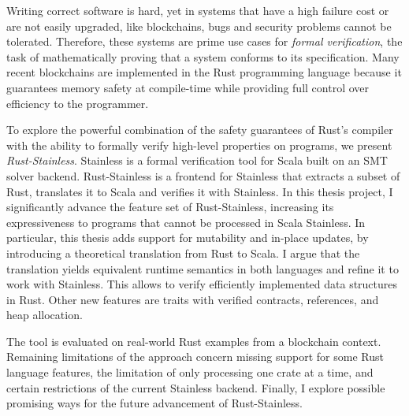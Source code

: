 Writing correct software is hard, yet in systems that have a high failure cost
or are not easily upgraded, like blockchains, bugs and security problems cannot
be tolerated. Therefore, these systems are prime use cases for \emph{formal
verification}, the task of mathematically proving that a system conforms to its
specification. Many recent blockchains are implemented in the Rust programming
language because it guarantees memory safety at compile-time while providing
full control over efficiency to the programmer.

To explore the powerful combination of the safety guarantees of Rust's compiler
with the ability to formally verify high-level properties on programs, we
present \emph{Rust-Stainless}. Stainless is a formal verification tool for Scala
built on an SMT solver backend. Rust-Stainless is a frontend for Stainless that
extracts a subset of Rust, translates it to Scala and verifies it with
Stainless. In this thesis project, I significantly advance the feature set of
Rust-Stainless, increasing its expressiveness to programs that cannot be
processed in Scala Stainless. In particular, this thesis adds support for
mutability and in-place updates, by introducing a theoretical translation from
Rust to Scala. I argue that the translation yields equivalent runtime semantics
in both languages and refine it to work with Stainless. This allows to verify
efficiently implemented data structures in Rust. Other new features are traits
with verified contracts, references, and heap allocation.

The tool is evaluated on real-world Rust examples from a blockchain context.
Remaining limitations of the approach concern missing support for some Rust
language features, the limitation of only processing one crate at a time, and
certain restrictions of the current Stainless backend. Finally, I explore
possible promising ways for the future advancement of Rust-Stainless.
